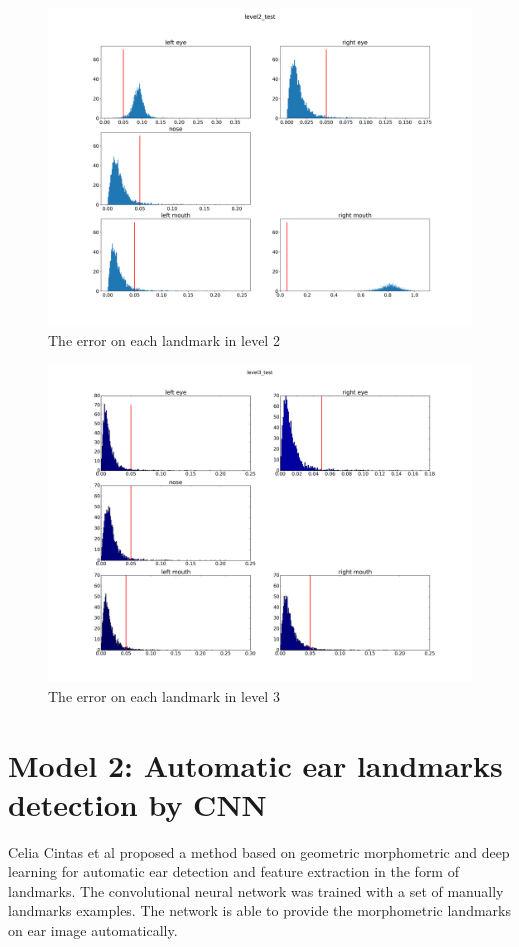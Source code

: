 \documentclass[12pt,a4paper]{article}
\begin{document}
\begin{figure}[!h]
	\centering
	\includegraphics[scale=0.3]{images/level2_test}
	\caption{The error on each landmark in level 2}
	\label{rslevel2}
\end{figure}
\begin{figure}[!h]
	\centering
	\includegraphics[scale=0.3]{images/level3_test}
	\caption{The error on each landmark in level 3}
	\label{rslevel3}
\end{figure}
\section{Model 2: Automatic ear landmarks detection by CNN}
Celia Cintas et al \cite{cintas2016automatic} proposed a method based on geometric morphometric and deep learning for automatic ear detection and feature extraction in the form of landmarks. The convolutional neural network was trained with a set of manually landmarks examples. The network is able to provide the morphometric landmarks on ear image automatically.
\end{document}

